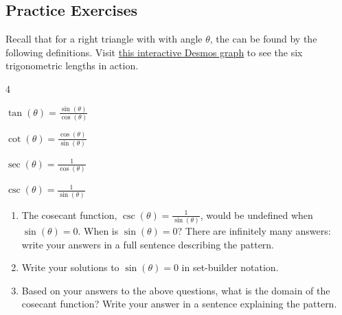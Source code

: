\newpage

\subsection*{Practice Exercises} \label{practice-exercises-section-graphs-of-other-trig-functions}



\begin{minipage}{0.9\textwidth}
		Recall that for a right triangle with with angle $\theta$, the  can be found by the following definitions. Visit \href{http://tiny.cc/six-trig-functions}{this interactive Desmos graph} to see the six trigonometric lengths in action.
	\end{minipage}
	\begin{minipage}{0.1\textwidth}
		\hfill {}
	\end{minipage}


	\begin{itemize}
	\end{itemize}

\begin{myPractice}
	\begin{enumerate}
		\item The cosecant function, $\csc(\theta)=\frac{1}{\sin(\theta)}$, would be undefined when $\sin(\theta)=0$. When is $\sin(\theta)=0$? There are infinitely many answers: write your answers in a full sentence describing the pattern.
		\vfill
		\item Write your solutions to $\sin(\theta)=0$ in set-builder notation.
		\vfill
		\item Based on your answers to the above questions, what is the domain of the cosecant function? Write your answer in a sentence explaining the pattern.
		\vfill
	\end{enumerate}
\end{myPractice}

